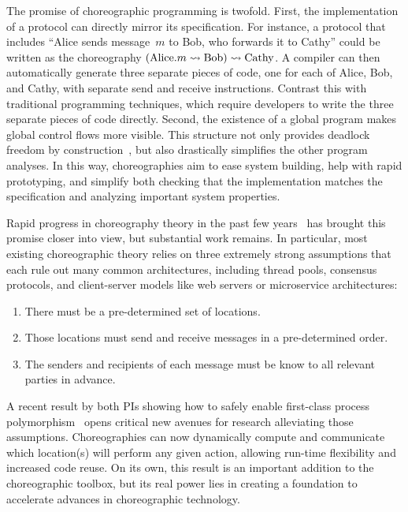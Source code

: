 The promise of choreographic programming is twofold.
First, the implementation of a protocol can directly mirror its specification.
For instance, a protocol that includes ``Alice sends message~$m$ to Bob, who forwards it to Cathy''
could be written as the choreography $(\text{Alice}.m \rightsquigarrow \text{Bob}) \rightsquigarrow \text{Cathy}$.
A compiler can then automatically generate three separate pieces of code, one for each of Alice, Bob, and Cathy,
with separate send and receive instructions.
Contrast this with traditional programming techniques, which require developers to write the three separate pieces of code directly.
Second, the existence of a global program makes global control flows more visible.
This structure not only provides deadlock freedom by construction~\cite{CarboneM13}, but also drastically simplifies the other program analyses.
In this way, choreographies aim to ease system building, help with rapid prototyping,
and simplify both checking that the implementation matches the specification
and analyzing important system properties.

Rapid progress in choreography theory in the past few years~\citep[e.g.,][]{HirschG22,CruzFilipeGLMP22,CruzFilipeGLMP23,BatesK+25,SamuelsonHC25}
has brought this promise closer into view, but substantial work remains.
In particular, most existing choreographic theory relies on three extremely strong assumptions
that each rule out many common architectures, including thread pools, consensus protocols, and client-server models like web servers or microservice architectures:
\begin{enumerate}
  \item\label{li:assume:static-locs}
    There must be a pre-determined set of locations.
  \item\label{li:assume:known-order}
    Those locations must send and receive messages in a pre-determined order.
  \item\label{li:assume:known-endpoints}
    The senders and recipients of each message must be know to all relevant parties in advance.
\end{enumerate}

A recent result by both PIs showing how to safely enable first-class process polymorphism~\citep{SamuelsonHC25} opens critical new avenues for research alleviating those assumptions.
Choreographies can now dynamically compute and communicate which location(s) will perform any given action,
allowing run-time flexibility and increased code reuse.
On its own, this result is an important addition to the choreographic toolbox,
but its real power lies in creating a foundation to accelerate advances in choreographic technology.

